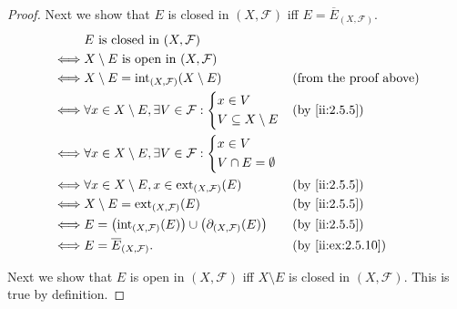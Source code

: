 \begin{proof}
  Next we show that \(E\) is closed in \((X, \mathcal{F})\) iff \(E = \overline{E}_{(X, \mathcal{F})}\).
  \begin{align*}
         & E \text{ is closed in } (X, \mathcal{F})                                                                                        \\
    \iff & X \setminus E \text{ is open in } (X, \mathcal{F})                                                                              \\
    \iff & X \setminus E = \text{int}_{(X, \mathcal{F})}(X \setminus E)                                 &  & \text{(from the proof above)} \\
    \iff & \forall x \in X \setminus E, \exists V \in \mathcal{F} : \begin{dcases}
                                                                      x \in V \\
                                                                      V \subseteq X \setminus E
                                                                    \end{dcases}                      &  & \by{ii:2.5.5}                   \\
    \iff & \forall x \in X \setminus E, \exists V \in \mathcal{F} : \begin{dcases}
                                                                      x \in V \\
                                                                      V \cap E = \emptyset
                                                                    \end{dcases}                                                    \\
    \iff & \forall x \in X \setminus E, x \in \text{ext}_{(X, \mathcal{F})}(E)                          &  & \by{ii:2.5.5}                 \\
    \iff & X \setminus E = \text{ext}_{(X, \mathcal{F})}(E)                                             &  & \by{ii:2.5.5}                 \\
    \iff & E = \big(\text{int}_{(X, \mathcal{F})}(E)\big) \cup \big(\partial_{(X, \mathcal{F})}(E)\big) &  & \by{ii:2.5.5}                 \\
    \iff & E = \overline{E}_{(X, \mathcal{F})}.                                                         &  & \by{ii:ex:2.5.10}
  \end{align*}

  Next we show that \(E\) is open in \((X, \mathcal{F})\) iff \(X \setminus E\) is closed in \((X, \mathcal{F})\).
  This is true by definition.


\end{proof}
